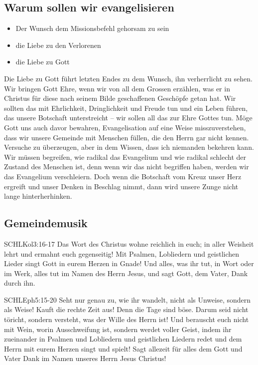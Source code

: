 \documentclass{../../inc/mybib}
\begin{document}
\subsection{Warum sollen wir evangelisieren}
\begin{itemize}
    \item Der Wunsch dem Missionsbefehl gehorsam zu sein
    \item die Liebe zu den Verlorenen
    \item die Liebe zu Gott
\end{itemize}
Die Liebe zu Gott führt letzten Endes zu dem Wunsch, ihn verherrlicht zu sehen. Wir bringen Gott Ehre, wenn wir von all dem Grossen erzählen, was er in Christus für diese nach seinem Bilde geschaffenen Geschöpfe getan hat. Wir sollten das mit Ehrlichkeit, Dringlichkeit und Freude tun und ein Leben führen, das unsere Botschaft unterstreicht -- wir sollen all das zur Ehre Gottes tun. Möge Gott uns auch davor bewahren, Evangelisation auf eine Weise misszuverstehen, dass wir unsere Gemeinde mit Menschen füllen, die den Herrn gar nicht kennen. Versuche zu überzeugen, aber in dem Wissen, dass ich niemanden bekehren kann. Wir müssen begreifen, wie radikal das Evangelium und wie radikal schlecht der Zustand des Menschen ist, denn wenn wir das nicht begriffen haben, werden wir das Evangelium verschleiern. Doch wenn die Botschaft vom Kreuz unser Herz ergreift und unser Denken in Beschlag nimmt, dann wird unsere Zunge nicht lange hinterherhinken.
\subsection{ Gemeindemusik}
\begin{bibelbox}{SCHL}{Kol}{3:16-17}
    Das Wort des Christus wohne reichlich in euch; in aller Weisheit lehrt und ermahnt euch gegenseitig! Mit Psalmen, Lobliedern und geistlichen Lieder singt Gott in eurem Herzen in Gnade! Und alles, was ihr tut, in Wort oder im Werk, alles tut im Namen des Herrn Jesus, und sagt Gott, dem Vater, Dank durch ihn.
\end{bibelbox}
\begin{bibelbox}{SCHL}{Eph}{5:15-20}
    Seht nur genau zu, wie ihr wandelt, nicht als Unweise, sondern als Weise! Kauft die rechte Zeit aus! Denn die Tage sind böse. Darum seid nicht töricht, sondern versteht, was der Wille des Herrn ist! Und berauscht euch nicht mit Wein, worin Ausschweifung ist, sondern werdet voller Geist, indem ihr zueinander in Psalmen und Lobliedern und geistlichen Liedern redet und dem Herrn mit eurem Herzen singt und spielt! Sagt allezeit für alles dem Gott und Vater Dank im Namen unseres Herrn Jesus Christus!
\end{bibelbox}
\end{document}
